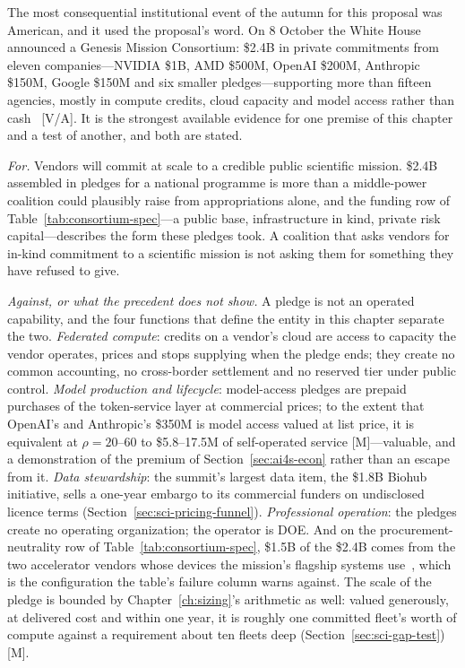 The most consequential institutional event of the autumn for this proposal was American, and it used the proposal's word. On 8 October the White House announced a Genesis Mission Consortium: \$2.4B in private commitments from eleven companies---NVIDIA \$1B, AMD \$500M, OpenAI \$200M, Anthropic \$150M, Google \$150M and six smaller pledges---supporting more than fifteen agencies, mostly in compute credits, cloud capacity and model access rather than cash~\cite{sci-wh-summit,sci-cdo-genesis} [V/A]. It is the strongest available evidence for one premise of this chapter and a test of another, and both are stated.

\emph{For.} Vendors will commit at scale to a credible public scientific mission. \$2.4B assembled in pledges for a national programme is more than a middle-power coalition could plausibly raise from appropriations alone, and the funding row of Table~\ref{tab:consortium-spec}---a public base, infrastructure in kind, private risk capital---describes the form these pledges took. A coalition that asks vendors for in-kind commitment to a scientific mission is not asking them for something they have refused to give.

\emph{Against, or what the precedent does not show.} A pledge is not an operated capability, and the four functions that define the entity in this chapter separate the two. \emph{Federated compute}: credits on a vendor's cloud are access to capacity the vendor operates, prices and stops supplying when the pledge ends; they create no common accounting, no cross-border settlement and no reserved tier under public control. \emph{Model production and lifecycle}: model-access pledges are prepaid purchases of the token-service layer at commercial prices; to the extent that OpenAI's and Anthropic's \$350M is model access valued at list price, it is equivalent at $\rho = 20$--$60$ to \$5.8--17.5M of self-operated service [M]---valuable, and a demonstration of the premium of Section~\ref{sec:ai4s-econ} rather than an escape from it. \emph{Data stewardship}: the summit's largest data item, the \$1.8B Biohub initiative, sells a one-year embargo to its commercial funders on undisclosed licence terms (Section~\ref{sec:sci-pricing-funnel}). \emph{Professional operation}: the pledges create no operating organization; the operator is DOE. And on the procurement-neutrality row of Table~\ref{tab:consortium-spec}, \$1.5B of the \$2.4B comes from the two accelerator vendors whose devices the mission's flagship systems use~\cite{genesis-scale,sci-ornl-lux}, which is the configuration the table's failure column warns against. The scale of the pledge is bounded by Chapter~\ref{ch:sizing}'s arithmetic as well: valued generously, at delivered cost and within one year, it is roughly one committed fleet's worth of compute against a requirement about ten fleets deep (Section~\ref{sec:sci-gap-test}) [M].

